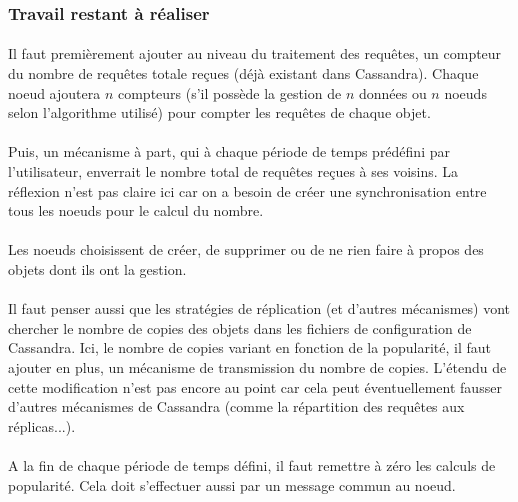\documentclass[12pt]{article}
\begin{document}
\subsubsection*{Travail restant à réaliser}

\paragraph{}Il faut premièrement ajouter au niveau du traitement des requêtes, un compteur du nombre de requêtes totale reçues (déjà existant dans Cassandra). Chaque noeud ajoutera $n$ compteurs (s'il possède la gestion de $n$ données ou $n$ noeuds selon l'algorithme utilisé) pour compter les requêtes de chaque objet.

\paragraph{}Puis, un mécanisme à part, qui à chaque période de temps prédéfini par l'utilisateur, enverrait le nombre total de requêtes reçues à ses voisins. La réflexion n'est pas claire ici car on a besoin de créer une synchronisation entre tous les noeuds pour le calcul du nombre.

\paragraph{}Les noeuds choisissent de créer, de supprimer ou de ne rien faire à propos des objets dont ils ont la gestion.

\paragraph{}Il faut penser aussi que les stratégies de réplication (et d'autres mécanismes) vont chercher le nombre de copies des objets dans les fichiers de configuration de Cassandra. Ici, le nombre de copies variant en fonction de la popularité, il faut ajouter en plus, un mécanisme de transmission du nombre de copies. L'étendu de cette modification n'est pas encore au point car cela peut éventuellement fausser d'autres mécanismes de Cassandra (comme la répartition des requêtes aux réplicas...).

\paragraph{}A la fin de chaque période de temps défini, il faut remettre à zéro les calculs de popularité. Cela doit s'effectuer aussi par un message commun au noeud.
\end{document}
